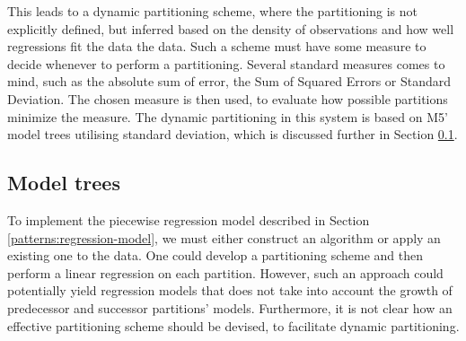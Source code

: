 This leads to a dynamic partitioning scheme, where the partitioning is not explicitly defined, but inferred based on the density of observations and how well regressions fit the data the data. Such a scheme must have some measure to decide whenever to perform a partitioning. Several standard measures comes to mind, such as the absolute sum of error, the Sum of Squared Errors or Standard Deviation. The chosen measure is then used, to evaluate how possible partitions minimize the measure.
The dynamic partitioning in this system is based on M5' model trees utilising standard deviation, which is discussed further in Section \ref{patterns:weka}. 



\subsection{Model trees}\label{patterns:weka}
To implement the piecewise regression model described in Section \ref{patterns:regression-model}, we must either construct an algorithm or apply an existing one to the data. One could develop a partitioning scheme and then perform a linear regression on each partition. However, such an approach could potentially yield regression models that does not take into account the growth of predecessor and successor partitions' models. Furthermore, it is not clear how an effective partitioning scheme should be devised, to facilitate dynamic partitioning.

